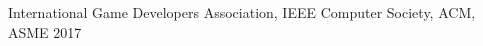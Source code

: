 
\begin{cvhonors}
	\cvhonor
	{} %
	{International Game Developers Association,  IEEE Computer Society,  ACM,  ASME} %
	{} %
	{2017} %
\end{cvhonors}